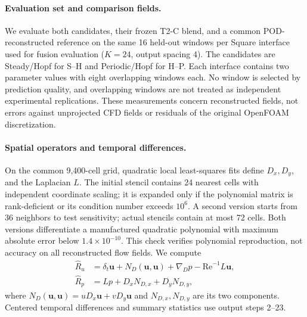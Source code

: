\paragraph{Evaluation set and comparison fields.}
We evaluate both candidates, their frozen T2-C blend, and a common
POD-reconstructed reference on the same 16 held-out windows per Square
interface used for fusion evaluation ($K=24$, output spacing 4).
The candidates are Steady/Hopf for S--H and Periodic/Hopf for H--P.
Each interface contains two parameter values with eight overlapping
windows each. No window is selected by prediction quality, and overlapping
windows are not treated as independent experimental replications.
These measurements concern reconstructed fields, not errors against
unprojected CFD fields or residuals of the original OpenFOAM discretization.

\paragraph{Spatial operators and temporal differences.}
On the common 9,400-cell grid, quadratic local least-squares fits define
$D_x,D_y$, and the Laplacian $L$. The initial stencil contains 24 nearest
cells with independent coordinate scaling; it is expanded only if the
polynomial matrix is rank-deficient or its condition number exceeds
$10^6$. A second version starts from 36 neighbors to test sensitivity;
actual stencils contain at most 72 cells. Both versions differentiate
a manufactured quadratic polynomial with maximum absolute error below
$1.4\times10^{-10}$. This check verifies polynomial reproduction, not
accuracy on all reconstructed flow fields. We compute
\begin{align}
\widehat R_u&=\delta_t\bm u+N_D(\bm u,\bm u)
+\nabla_Dp-\mathrm{Re}^{-1}L\bm u,\\
\widehat R_p&=Lp+D_xN_{D,x}+D_yN_{D,y},
\end{align}
where $N_D(\bm u,\bm u)=uD_x\bm u+vD_y\bm u$ and
$N_{D,x},N_{D,y}$ are its two components. Centered temporal differences
and summary statistics use output steps 2--23.

